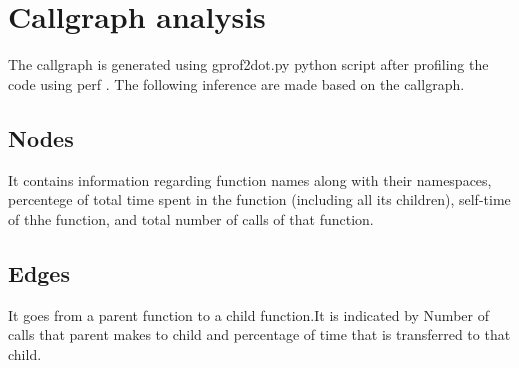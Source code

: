 \documentclass[11pt]{article}
\begin{document}
\section{Callgraph analysis}
The callgraph is generated using gprof2dot.py \cite{lab07} python script after profiling the code using perf \cite{lab07}. The following inference are made based on the callgraph.
	\subsection{Nodes}
	It contains information regarding function names along with their namespaces, percentege of total time spent in the function
	(including all its children), self-time of thhe function, and total number of calls of that function.
	\subsection{Edges}
	It goes from a parent function to a child function.It is indicated by Number of calls that parent makes to child and percentage of 	time that is
	transferred to that child.
\end{document}
